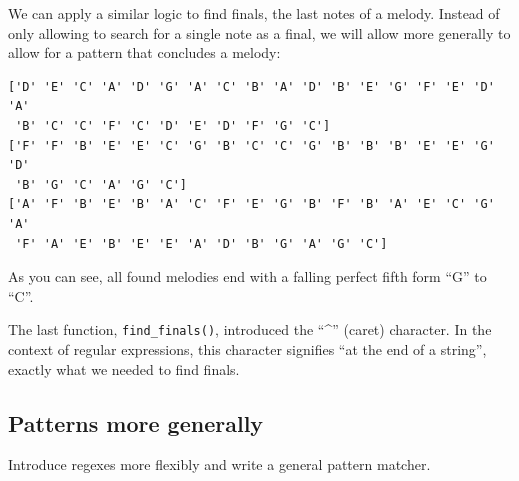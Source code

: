 \documentclass[
  a4paperpaper,
  ,captions=tableheading
]{scrbook}
\newenvironment{Shaded}{\begin{snugshade}}{\end{snugshade}}
\newcommand{\BuiltInTok}[1]{\textcolor[rgb]{0.00,0.23,0.31}{#1}}
\newcommand{\ControlFlowTok}[1]{\textcolor[rgb]{0.00,0.23,0.31}{#1}}
\newcommand{\DecValTok}[1]{\textcolor[rgb]{0.68,0.00,0.00}{#1}}
\newcommand{\KeywordTok}[1]{\textcolor[rgb]{0.00,0.23,0.31}{#1}}
\newcommand{\NormalTok}[1]{\textcolor[rgb]{0.00,0.23,0.31}{#1}}
\newcommand{\OperatorTok}[1]{\textcolor[rgb]{0.37,0.37,0.37}{#1}}
\newcommand{\StringTok}[1]{\textcolor[rgb]{0.13,0.47,0.30}{#1}}
\newcommand{\VariableTok}[1]{\textcolor[rgb]{0.07,0.07,0.07}{#1}}
\begin{document}
We can apply a similar logic to find finals, the last notes of a melody.
Instead of only allowing to search for a single note as a final, we will
allow more generally to allow for a pattern that concludes a melody:

\begin{Shaded}
\end{Shaded}

\begin{verbatim}
['D' 'E' 'C' 'A' 'D' 'G' 'A' 'C' 'B' 'A' 'D' 'B' 'E' 'G' 'F' 'E' 'D' 'A'
 'B' 'C' 'C' 'F' 'C' 'D' 'E' 'D' 'F' 'G' 'C']
['F' 'F' 'B' 'E' 'E' 'C' 'G' 'B' 'C' 'C' 'G' 'B' 'B' 'B' 'E' 'E' 'G' 'D'
 'B' 'G' 'C' 'A' 'G' 'C']
['A' 'F' 'B' 'E' 'B' 'A' 'C' 'F' 'E' 'G' 'B' 'F' 'B' 'A' 'E' 'C' 'G' 'A'
 'F' 'A' 'E' 'B' 'E' 'E' 'A' 'D' 'B' 'G' 'A' 'G' 'C']
\end{verbatim}

As you can see, all found melodies end with a falling perfect fifth form
``G'' to ``C''.

The last function, \texttt{find\_finals()}, introduced the ``\^{}''
(caret) character. In the context of regular expressions, this character
signifies ``at the end of a string'', exactly what we needed to find
finals.

\hypertarget{patterns-more-generally}{%
\subsection{Patterns more generally}\label{patterns-more-generally}}

\begin{tcolorbox}[enhanced jigsaw, arc=.35mm, colbacktitle=quarto-callout-warning-color!10!white, colback=white, breakable, toprule=.15mm, title=\textcolor{quarto-callout-warning-color}{\faExclamationTriangle}\hspace{0.5em}{Todo}, left=2mm, bottomtitle=1mm, toptitle=1mm, leftrule=.75mm, opacitybacktitle=0.6, titlerule=0mm, opacityback=0, rightrule=.15mm, bottomrule=.15mm, coltitle=black, colframe=quarto-callout-warning-color-frame]

Introduce regexes more flexibly and write a general pattern matcher.

\end{tcolorbox}
\end{document}
